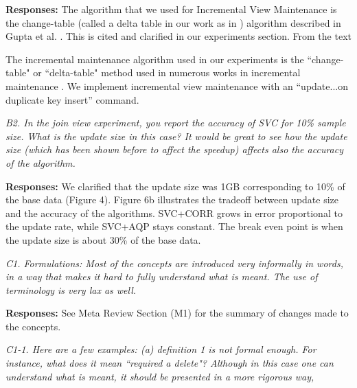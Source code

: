 \vspace{.25em}

{\bf Responses:} The algorithm that we used for Incremental View Maintenance is the change-table (called a delta table in our work as in \cite{DBLP:journals/vldb/KochAKNNLS14}) algorithm described in Gupta et al. \cite{gupta1995maintenance,gupta2006incremental}. This is cited and clarified in our experiments section. From the text\begin{displayquote} 
The incremental maintenance algorithm used in our experiments is the ``change-table" or ``delta-table" method used in numerous works in incremental maintenance \cite{gupta1995maintenance,gupta2006incremental, DBLP:journals/vldb/KochAKNNLS14}.
We implement incremental view maintenance with an ``update...on duplicate key insert'' command.
\end{displayquote} 


\vspace{1em}
\emph{B2. In the join view experiment, you report the accuracy of SVC for 10\% sample size. What is the update size in this case? It would be great to see how the update size (which has been shown before to affect the speedup) affects also the accuracy of the algorithm.}

\vspace{.25em}

{\bf Responses:} We clarified that the update size was 1GB corresponding to 10\% of the base data (Figure 4). Figure 6b illustrates the tradeoff between update size and the accuracy of the algorithms. SVC+CORR grows in error proportional to the update rate, while SVC+AQP stays constant. The break even point is when the update size is about 30\% of the base data. 

\vspace{1em}
\emph{C1. Formulations: Most of the concepts are introduced very informally in words, in a way that makes it hard to fully understand what is meant. The use of terminology is very lax as well. }

\vspace{.25em}

{\bf Responses:} See Meta Review Section (M1) for the summary of changes made to the concepts.

\vspace{1em}
\emph{C1-1. Here are a few examples: (a) definition 1 is not formal enough. For instance, what does it mean ``required a delete"? Although in this case one can understand what is meant, it should be presented in a more rigorous way,} 

